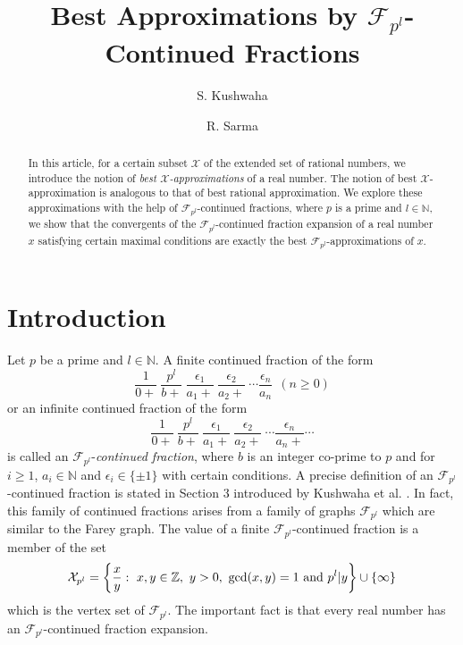 \documentclass[12pt]{elsarticle}
\theoremstyle{definition}
\newcommand{\field}[1]{\mathbb{#1}}          \newcommand{\Q}{\field{Q}}
\newcommand{\N}{\field{N}}
\newcommand{\mF}{{\mathcal F}}
\newcommand{\f}{{\mathcal F}}
\newcommand{\ep}{\epsilon}
\begin{document}
	\title{ Best Approximations by $\mathcal{F}_{p^l}$-Continued Fractions} 
	
	\author[sk]{S. Kushwaha}  
	\author[rvt]{R. Sarma} 

	
	\address[sk]{Department of Applied Sciences, Indian Institute of Information Technology Allahabad, Prayagraj, India}
	\address[rvt]{Department of Mathematics,
		Indian Institute of Technology Delhi, India}

	\begin{abstract}
		
		In this article, for a certain subset $\mathcal{X}$ of the extended set of rational numbers, we introduce the notion of {\it best $\mathcal{X}$-approximations} of a real number.  The notion of best $\mathcal{X}$-approximation  is analogous to that of best rational approximation.   We explore these approximations with the help of $\mathcal{F}_{p^l}$-continued fractions, where $p$ is a prime and $l\in\mathbb{N}$, we show that the convergents of the $\mathcal{F}_{p^l}$-continued fraction expansion  of a real number $x$ satisfying certain maximal conditions are exactly the best $\mathcal{F}_{p^l}$-approximations of $x$.
	
	\end{abstract}
	\maketitle	
	\section{Introduction}


Let $p$ be a prime and $l\in \N.$	A finite continued fraction of the form $$\frac{1}{0+}~\frac{{p^l}}{b+}~\frac{\epsilon_{1} }{a_{1}+}~\frac{\epsilon_{2}}{a_{2}+}~\cdots\frac{\epsilon_{n}}{a_{n}}~~(n\ge 0)$$
or
an infinite continued fraction of the form
$$\frac{1}{0+}~\frac{{p^l}}{b+}~\frac{\epsilon_{1} }{a_{1}+}~\frac{\epsilon_{2}}{a_{2}+}~\cdots\frac{\epsilon_{n}}{a_{n}+}\cdots$$ 
is called an $\mF_{{p^l}}$-{\it continued fraction},
 where $b$ is an integer co-prime to $p$ and for $i\ge1$,  $a_i\in\N$ and  $\ep_i\in\{\pm1\}$  with certain conditions.  A precise definition of an $\f_{{p^l}}$-continued fraction is stated in Section 3 introduced by Kushwaha et al. \cite{seemafnpart1}.
  In fact, this family of continued fractions  arises from a family of graphs $\f_{{p^l}}$ which are similar to the Farey graph. The value of a finite $\f_{p^l}$-continued fraction is a member of the set 
 \begin{equation}\label{X_n}
 		\mathcal{X}_{p^l}=\left\{\frac{x}{y}:~x,y\in\mathbb{Z},~ y>0,~\mathrm{gcd}(x,y)=1~\textnormal{and}~{p^l}|y\right\}\cup\{\infty\}
\end{equation}   
 which is the vertex set of $\f_{p^l}$.
 The important fact is that every real number has an $\f_{p^l}$-continued fraction expansion.
\end{document}
